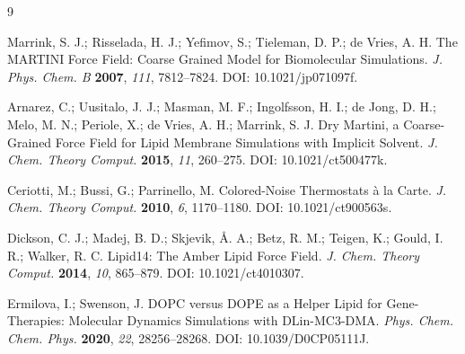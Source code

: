 \documentclass{article}
\begin{document}
\begin{thebibliography}{9}

Marrink, S. J.; Risselada, H. J.; Yefimov, S.; Tieleman, D. P.; de Vries, A. H.
The MARTINI Force Field: Coarse Grained Model for Biomolecular Simulations.
\emph{J. Phys. Chem. B} \textbf{2007}, \emph{111}, 7812--7824.
DOI: 10.1021/jp071097f.

Arnarez, C.; Uusitalo, J. J.; Masman, M. F.; Ingolfsson, H. I.; de Jong, D. H.;
Melo, M. N.; Periole, X.; de Vries, A. H.; Marrink, S. J.
Dry Martini, a Coarse-Grained Force Field for Lipid Membrane Simulations with
Implicit Solvent.
\emph{J. Chem. Theory Comput.} \textbf{2015}, \emph{11}, 260--275.
DOI: 10.1021/ct500477k.

Ceriotti, M.; Bussi, G.; Parrinello, M.
Colored-Noise Thermostats \`a la Carte.
\emph{J. Chem. Theory Comput.} \textbf{2010}, \emph{6}, 1170--1180.
DOI: 10.1021/ct900563s.

Dickson, C. J.; Madej, B. D.; Skjevik, {\AA}. A.; Betz, R. M.; Teigen, K.;
Gould, I. R.; Walker, R. C.
Lipid14: The Amber Lipid Force Field.
\emph{J. Chem. Theory Comput.} \textbf{2014}, \emph{10}, 865--879.
DOI: 10.1021/ct4010307.

Ermilova, I.; Swenson, J.
DOPC versus DOPE as a Helper Lipid for Gene-Therapies: Molecular Dynamics
Simulations with DLin-MC3-DMA.
\emph{Phys. Chem. Chem. Phys.} \textbf{2020}, \emph{22}, 28256--28268.
DOI: 10.1039/D0CP05111J.

\end{thebibliography}
\end{document}
